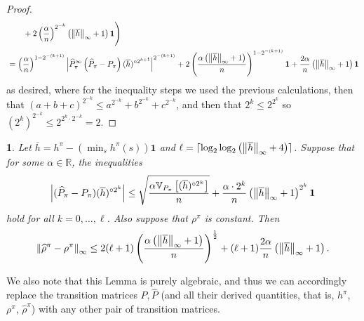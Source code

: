 \documentclass{article}
\theoremstyle{plain}
\theoremstyle{plain}
\newtheorem{lem}[thm]{\protect\lemmaname}
\theoremstyle{remark}
\theoremstyle{plain}
\theoremstyle{plain}
\providecommand{\lemmaname}{Lemma}
\newcommand{\R}{\mathbb{R}}
\newcommand{\Var}{\mathbb{V}}
\newcommand{\Phat}{\widehat{P}}
\newcommand{\one}{\mathbf{1}}
\newcommand{\hc}{\overline{h}}
\newcommand{\rhohat}{\widehat{\rho}}
\begin{document}
\begin{proof}
\begin{align*}
    & \quad \quad + 2\left(\frac{\alpha   }{n}\right)^{2^{-k}}\left(\infnorm{\hc} + 1 \right) \one   \Bigg) \\
    &= \left(\frac{\alpha}{n}\right)^{1-2^{-(k+1)}}  \left|  \Phat_\pi^\infty \left(\Phat_\pi - P_\pi \right) (\hc)^{\circ 2^{k+1} } \right|^{2^{-(k+1)}} + 2 \left(\frac{\alpha \left(\infnorm{\hc} + 1\right)}{n} \right)^{1 - 2^{-(k+1)}}\one+ \frac{2\alpha   }{n}\left(\infnorm{\hc} + 1 \right) \one   
\end{align*}
    as desired, where for the inequality steps we used the previous calculations, then that $(a + b + c)^{2^{-k}} \leq a^{2^{-k}} + b^{2^{-k}} + c^{2^{-k}}$, and then that $2^k \leq 2^{2^k}$ so $(2^{k})^{2^{-k}} \leq 2^{2^k \cdot 2^{-k}} = 2$.
\end{proof}

\begin{lem}
\label{lem:AMDP_full_var_param_bound}
    Let $\hc = h^{\pi} - \left(\min_s h^{\pi}(s)\right)\one$ and $\ell = \lceil\log_2 \log_2 \left( \infnorm{\hc} + 4\right) \rceil$. Suppose that for some $\alpha \in \R$, the inequalities
    \begin{align*}
       \left|(\Phat_\pi - P_\pi) (\hc)^{\circ 2^k} \right| \leq \sqrt{\frac{\alpha \Var_{P_\pi}\left[(\hc)^{\circ 2^k} \right] }{n}} + \frac{\alpha \cdot 2^k  }{n} \left(\infnorm{\hc} + 1 \right)^{2^k} \one
    \end{align*}
    hold for all $k = 0, \dots, \ell$. Also suppose that $\rho^\pi$ is constant.
    Then
    \begin{align*}
    \infnorm{\rhohat^\pi - \rho^\pi} \leq 2 (\ell + 1) \left(\frac{\alpha \left(\infnorm{\hc} + 1\right)}{n} \right)^{ \frac{1}{2}}+ (\ell+1) \frac{2\alpha   }{n}\left(\infnorm{\hc} + 1 \right).
\end{align*}
\end{lem}
We also note that this Lemma is purely algebraic, and thus we can accordingly replace the transition matrices $P, \Phat$ (and all their derived quantities, that is, $h^\pi$, $\rho^\pi$, $\rhohat^\pi$) with any other pair of transition matrices.
\end{document}
